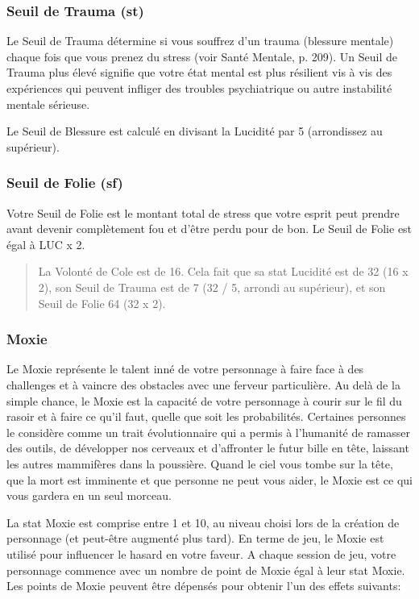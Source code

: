 \subsubsection{Seuil de Trauma (st)} \label{sec:trauma-threshold-tt} 

Le Seuil de Trauma détermine si vous souffrez d'un trauma (blessure mentale) chaque fois que vous prenez du stress (voir Santé Mentale, p. 209). Un Seuil de Trauma plus élevé signifie que votre état mental est plus résilient vis à vis des expériences qui peuvent infliger des troubles psychiatrique ou autre instabilité mentale sérieuse. 

Le Seuil de Blessure est calculé en divisant la Lucidité par 5 (arrondissez au supérieur). 

\subsubsection{Seuil de Folie (sf)} \label{sec:insanity-rating-ir} 

Votre Seuil de Folie est le montant total de stress que votre esprit peut prendre avant devenir complètement fou et d'être perdu pour de bon. Le Seuil de Folie est égal à LUC x 2. 

\begin{quotation} La Volonté de Cole est de 16. Cela fait que sa stat Lucidité est de 32 (16 x 2), son Seuil de Trauma est de 7 (32 / 5, arrondi au supérieur), et son Seuil de Folie 64 (32 x 2). \end{quotation} 

\subsubsection{Moxie} \label{sec:moxie} 

Le Moxie représente le talent inné de votre personnage à faire face à des challenges et à vaincre des obstacles avec une ferveur particulière. Au delà de la simple chance, le Moxie est la capacité de votre personnage à courir sur le fil du rasoir et à faire ce qu'il faut, quelle que soit les probabilités. Certaines personnes le considère comme un trait évolutionnaire qui a permis à l'humanité de ramasser des outils, de développer nos cerveaux et d'affronter le futur bille en tête, laissant les autres mammifères dans la poussière. Quand le ciel vous tombe sur la tête, que la mort est imminente et que personne ne peut vous aider, le Moxie est ce qui vous gardera en un seul morceau. 

La stat Moxie est comprise entre 1 et 10, au niveau choisi lors de la création de personnage (et peut-être augmenté plus tard). En terme de jeu, le Moxie est utilisé pour influencer le hasard en votre faveur. A chaque session de jeu, votre personnage commence avec un nombre de point de Moxie égal à leur stat Moxie. Les points de Moxie peuvent être dépensés pour obtenir l'un des effets suivants: 

